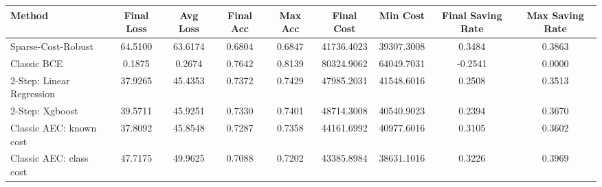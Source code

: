 \begin{tabular}{lcccccccc}
\toprule
Method & Final Loss & Avg Loss & Final Acc & Max Acc & Final Cost & Min Cost & Final Saving Rate & Max Saving Rate \\
\midrule
Sparse-Cost-Robust & 64.5100 & 63.6174 & 0.6804 & 0.6847 & 41736.4023 & 39307.3008 & 0.3484 & 0.3863 \\
Classic BCE & 0.1875 & 0.2674 & 0.7642 & 0.8139 & 80324.9062 & 64049.7031 & -0.2541 & 0.0000 \\
2-Step: Linear Regression & 37.9265 & 45.4353 & 0.7372 & 0.7429 & 47985.2031 & 41548.6016 & 0.2508 & 0.3513 \\
2-Step: Xgboost & 39.5711 & 45.9251 & 0.7330 & 0.7401 & 48714.3008 & 40540.9023 & 0.2394 & 0.3670 \\
Classic AEC: known cost & 37.8092 & 45.8548 & 0.7287 & 0.7358 & 44161.6992 & 40977.6016 & 0.3105 & 0.3602 \\
Classic AEC: class cost & 47.7175 & 49.9625 & 0.7088 & 0.7202 & 43385.8984 & 38631.1016 & 0.3226 & 0.3969 \\
\bottomrule
\end{tabular}
